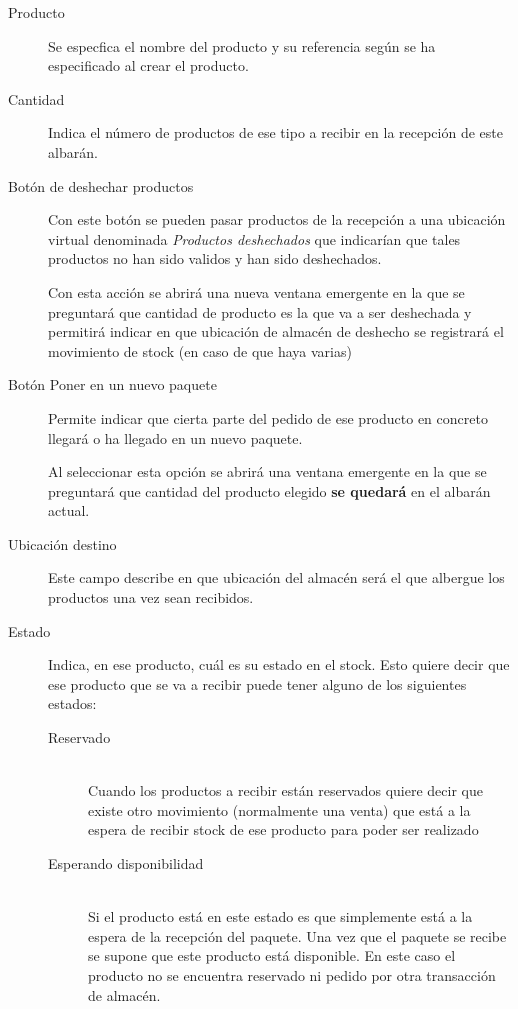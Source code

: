 \begin{description}
  \item[Producto] Se especfica el nombre del producto y su referencia según se ha especificado al crear el producto.

  \item[Cantidad] Indica el número de productos de ese tipo a recibir en la recepción de este albarán.

  \item[Botón de deshechar productos] Con este botón se pueden pasar productos de la recepción a una ubicación virtual denominada \emph{Productos deshechados} que indicarían que tales productos no han sido validos y han sido deshechados.

Con esta acción se abrirá una nueva ventana emergente en la que se preguntará que cantidad de producto es la que va a ser deshechada y permitirá indicar en que ubicación de almacén de deshecho se registrará el movimiento de stock (en caso de que haya varias)

  \item[Botón Poner en un nuevo paquete] Permite indicar que cierta parte del pedido de ese producto en concreto llegará o ha llegado en un nuevo paquete.

Al seleccionar esta opción se abrirá una ventana emergente en la que se preguntará que cantidad del producto elegido \textbf{se quedará} en el albarán actual.

  \item[Ubicación destino] Este campo describe en que ubicación del almacén será el que albergue los productos una vez sean recibidos.

  \item[Estado] Indica, en ese producto, cuál es su estado en el stock. Esto quiere decir que ese producto que se va a recibir puede tener alguno de los siguientes estados:

    \begin{description}
    \item[Reservado] \hfill \\ Cuando los productos a recibir están reservados quiere decir que existe otro movimiento (normalmente una venta) que está a la espera de recibir stock de ese producto para poder ser realizado
    \item[Esperando disponibilidad] \hfill \\ Si el producto está en este estado es que simplemente está a la espera de la recepción del paquete. Una vez que el paquete se recibe se supone que este producto está disponible. En este caso el producto no se encuentra reservado ni pedido por otra transacción de almacén.
    \end{description}
\end{description}

